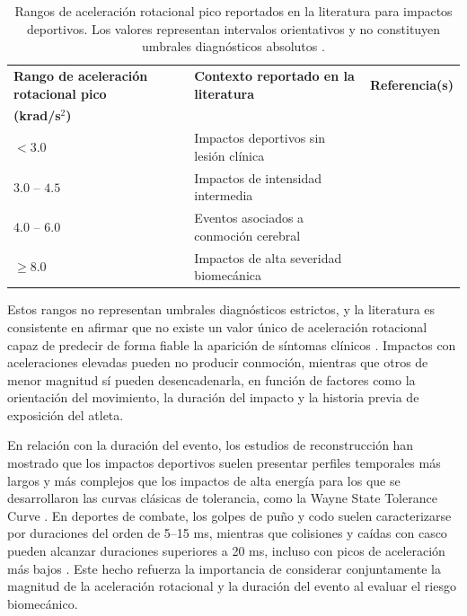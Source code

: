 \begin{table}[t]
\centering
\small
\begin{tabular}{p{4cm} p{6cm} p{3cm}}
\hline
\textbf{Rango de aceleración rotacional pico} & \textbf{Contexto reportado en la literatura} & \textbf{Referencia(s)} \\
\textbf{(krad/s$^2$)} & & \\
\hline
$< 3.0$ & Impactos deportivos sin lesión clínica & \cite{Lota2022} \\

$3.0$ -- $4.5$ & Impactos de intensidad intermedia & \cite{Lota2022,Hoshizaki2017} \\

$4.0$ -- $6.0$ & Eventos asociados a conmoción cerebral & \cite{Lota2022,Hoshizaki2017} \\

$\geq 8.0$ & Impactos de alta severidad biomecánica & \cite{Lota2022,Hoshizaki2017} \\

\hline
\end{tabular}
\caption{Rangos de aceleración rotacional pico reportados en la literatura para impactos deportivos. Los valores representan intervalos orientativos y no constituyen umbrales diagnósticos absolutos \cite{Guskiewicz2011}.}
\label{tab:rangos_rotacionales}
\end{table}


Estos rangos no representan umbrales diagnósticos estrictos, y la literatura es consistente en afirmar que no existe un valor único de aceleración rotacional capaz de predecir de forma fiable la aparición de síntomas clínicos \cite{Guskiewicz2011}. Impactos con aceleraciones elevadas pueden no producir conmoción, mientras que otros de menor magnitud sí pueden desencadenarla, en función de factores como la orientación del movimiento, la duración del impacto y la historia previa de exposición del atleta.

En relación con la duración del evento, los estudios de reconstrucción han mostrado que los impactos deportivos suelen presentar perfiles temporales más largos y más complejos que los impactos de alta energía para los que se desarrollaron las curvas clásicas de tolerancia, como la Wayne State Tolerance Curve \cite{Hoshizaki2017}. En deportes de combate, los golpes de puño y codo suelen caracterizarse por duraciones del orden de 5–15 ms, mientras que colisiones y caídas con casco pueden alcanzar duraciones superiores a 20 ms, incluso con picos de aceleración más bajos \cite{Hoshizaki2017}. Este hecho refuerza la importancia de considerar conjuntamente la magnitud de la aceleración rotacional y la duración del evento al evaluar el riesgo biomecánico.

